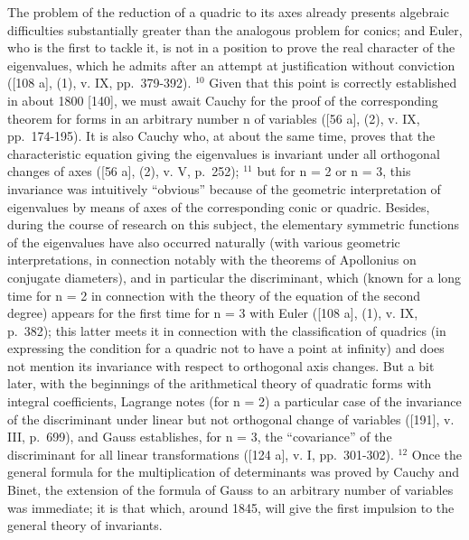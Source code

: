 The problem of the reduction of a quadric to its axes already presents algebraic difficulties substantially greater than the analogous problem for conics; and Euler, who is the first to tackle it, is not in a position to prove the real character of the eigenvalues, which he admits after an attempt at justification without conviction ({[}108 a{]}, (1), v. IX, pp.~379-392). \(^{10}\) Given that this point is correctly established in about 1800 {[}140{]}, we must await Cauchy for the proof of the corresponding theorem for forms in an arbitrary number n of variables ({[}56 a{]}, (2), v. IX, pp.~174-195). It is also Cauchy who, at about the same time, proves that the characteristic equation giving the eigenvalues is invariant under all orthogonal changes of axes ({[}56 a{]}, (2), v. V, p.~252); \(^{11}\) but for n = 2 or n = 3, this invariance was intuitively ``obvious'' because of the geometric interpretation of eigenvalues by means of axes of the corresponding conic or quadric. Besides, during the course of research on this subject, the elementary symmetric functions of the eigenvalues have also occurred naturally (with various geometric interpretations, in connection notably with the theorems of Apollonius on conjugate diameters), and in particular the discriminant, which (known for a long time for n = 2 in connection with the theory of the equation of the second degree) appears for the first time for n = 3 with Euler ({[}108 a{]}, (1), v. IX, p.~382); this latter meets it in connection with the classification of quadrics (in expressing the condition for a quadric not to have a point at infinity) and does not mention its invariance with respect to orthogonal axis changes. But a bit later, with the beginnings of the arithmetical theory of quadratic forms with integral coefficients, Lagrange notes (for n = 2) a particular case of the invariance of the discriminant under linear but not orthogonal change of variables ({[}191{]}, v. III, p.~699), and Gauss establishes, for n = 3, the ``covariance'' of the discriminant for all linear transformations ({[}124 a{]}, v. I, pp.~301-302). \(^{12}\) Once the general formula for the multiplication of determinants was proved by Cauchy and Binet, the extension of the formula of Gauss to an arbitrary number of variables was immediate; it is that which, around 1845, will give the first impulsion to the general theory of invariants.

